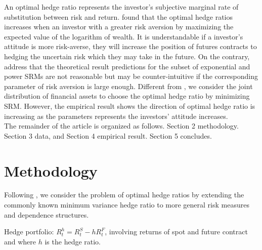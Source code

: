 \documentclass[11pt,a4paper,english]{article}
\begin{document}
An optimal hedge ratio represents the investor's subjective marginal rate of substitution between risk and return. \citet{cecchetti1988estimation} found that the optimal hedge ratios increases when an investor with a greater risk aversion by maximizing the expected value of the logarithm of wealth.
It is understandable if a investor's attitude is more risk-averse, they will increase the position of futures contracts to hedging the uncertain risk which they may take in the future.
On the contrary, \citet{brandtner2015decision} address that the theoretical result predictions for the subset of exponential and power SRMs are not reasonable but may be counter-intuitive if the corresponding parameter of risk aversion is large enough.
Different from \citet{brandtner2015decision}, we consider the joint distribution of financial assets to choose the optimal hedge ratio by minimizing SRM.
However, the empirical result shows the direction of optimal hedge ratio is increasing as the parameters represents the investors' attitude increases. \\


The remainder
of the article is organized as follows. Section 2 methodology. Section 3 data, and Section 4 empirical result. Section 5 concludes.\\


\section{Methodology}\label{sec:methodology}
Following \citet{barbi2014copula}, we consider the problem of optimal
hedge ratios by extending the commonly known minimum variance hedge
ratio to more general risk measures and dependence
structures.\medskip

Hedge portfolio: $R_t^h = R_t^S - h R_t^F$, involving returns of spot
and future contract and where $h$ is the hedge ratio.\medskip
\end{document}
